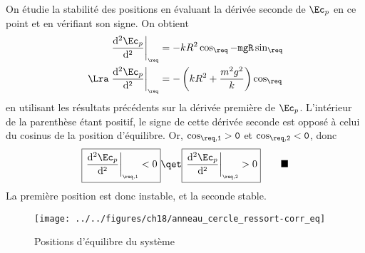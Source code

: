 \documentclass[a4paper, 11pt]{book}
\newcommand{\qed}{\tag*{$\blacksquare$}}
\begin{document}
{On étudie la stabilité des positions en évaluant la dérivée seconde de
    $\Ec_p$ en ce point et en vérifiant son signe. On obtient
    \begin{align*}
        \eval{\dv[2]{\Ec_p}{\tt}}_{\tt_{\req}} &= -kR^2\cos\tt_{\req}
        -mgR\sin\tt_{\req}
        \\\Lra
        \eval{\dv[2]{\Ec_p}{\tt}}_{\tt_{\req}} &= -\left(kR^2 +
            \frac{m^2g^2}{k}\right)\cos\tt_{\req}
    \end{align*}
    en utilisant les résultats précédents sur la dérivée première de
    $\Ec_p$. L'intérieur de la parenthèse étant positif, le signe de cette
    dérivée seconde est opposé à celui du cosinus de la position
    d'équilibre. Or,
    $\cos\tt_{\req,1} > 0$ et $\cos\tt_{\req,2} < 0$, donc
    \begin{gather*}
        \boxed{\eval{\dv[2]{\Ec_p}{\tt}}_{\tt_{\req,1}} < 0}
        \qet
        \boxed{\eval{\dv[2]{\Ec_p}{\tt}}_{\tt_{\req,2}} > 0}
        \qed
    \end{gather*}
    La première position est donc instable, et la seconde stable.
    \begin{figure}[htbp]
        \centering
        \texttt{[image: ../../figures/ch18/anneau\_cercle\_ressort-corr\_eq]}
        \captionsetup{justification=centering}
        \caption{Positions d'équilibre du système}
        \label{fig:anncerccorr}
    \end{figure}
}

\label{LastPage}
\end{document}

